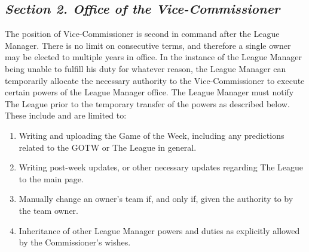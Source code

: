 \documentclass{article}
\begin{document}
    \subsection*{\textit{Section 2. Office of the Vice-Commissioner}}
    The position of Vice-Commissioner is second in command after the League Manager. There is no limit on consecutive terms, and therefore a single owner may be elected to multiple years in office. In the instance of the League Manager being unable to fulfill his duty for whatever reason, the League Manager can temporarily allocate the necessary authority to the Vice-Commissioner to execute certain powers of the League Manager office. The League Manager must notify The League prior to the temporary transfer of the powers as described below. These include and are limited to:
    \begin{enumerate}[label=\Alph*)]
        \item Writing and uploading the Game of the Week, including any predictions related to the GOTW or The League in general.
        \item Writing post-week updates, or other necessary updates regarding The League to the main page.
        \item Manually change an owner’s team if, and only if, given the authority to by the team owner.
        \item Inheritance of other League Manager powers and duties as explicitly allowed by the Commissioner’s wishes.
    \end{enumerate}
\end{document}
